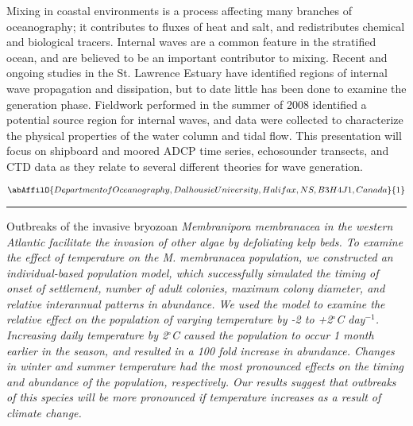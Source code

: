 \noindent Mixing in coastal environments is a process affecting many branches of oceanography; it contributes to fluxes of heat and salt, and redistributes chemical and biological tracers. Internal waves are a common feature in the stratified ocean, and are believed to be an important contributor to mixing. Recent and ongoing studies in the St. Lawrence Estuary have identified regions of internal wave propagation and dissipation, but to date little has been done to examine the generation phase. Fieldwork performed in the summer of 2008 identified a potential source region for internal waves, and data were collected to characterize the physical properties of the water column and tidal flow. This presentation will focus on shipboard and moored ADCP time series, echosounder transects, and CTD data as they relate to several different theories for wave generation.

\begin{center}
   \vspace{2 mm} \begin{center}
    \vspace{2 mm}\begin{center}
  
  $\abAffilO{Department of Oceanography, Dalhousie University, Halifax, NS, B3H 4J1, Canada}{1}$

  \end{center}
  \vspace{2 mm}
  \end{center}\end{center}
  \begin{center}\rule{0.70\linewidth}{0.5 pt}\end{center}

\noindent Outbreaks of the invasive bryozoan \sl Membranipora membranacea \rm in the western Atlantic facilitate the invasion of other algae by defoliating kelp beds. To examine the effect of temperature on the \sl M. membranacea \rm population, we constructed an individual-based population model, which successfully simulated the timing of onset of settlement, number of adult colonies, maximum colony diameter, and relative interannual patterns in abundance. We used the model to examine the relative effect on the population of varying temperature by -2 to +2$^{\circ}$C day$^{-1}$. Increasing daily temperature by 2$^{\circ}$C caused the population to occur 1 month earlier in the season, and resulted in a 100 fold increase in abundance. Changes in winter and summer temperature had the most pronounced effects on the timing and abundance of the population, respectively. Our results suggest that outbreaks of this species will be more pronounced if temperature increases as a result of climate change. 

